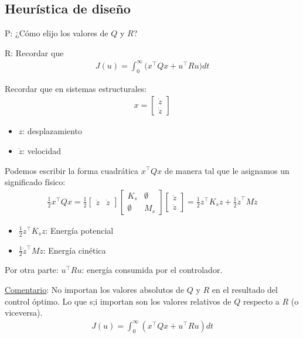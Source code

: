 \subsection{Heurística de diseño}
\par P: ¿Cómo elijo los valores de $Q$ y $R$? 
\par R: Recordar que
\begin{align*}
    J(u) = \int_0^\infty \Big( x^\top Qx+u^\top Ru\Big) dt
\end{align*}
\par Recordar que en sistemas estructurales:
\begin{align*}
    x = \left[
    \begin{array}{c}
     \dot{z} \\ \dot{z} 
    \end{array}\right]
\end{align*}

\begin{itemize}
    \item $z$: desplazamiento
    \item $\dot{z}$: velocidad
\end{itemize}

Podemos escribir la forma cuadrática $x^\top Q x$ de manera tal que le asignamos un significado físico:
\begin{align*}
    \frac{1}{2}x^\top Qx=\frac{1}{2}\left[
    \begin{array}{cc}
     \dot{z} & \dot{z} 
    \end{array}\right] \left[
    \begin{array}{cc}
     K_s & \emptyset \\ \emptyset & M_s 
    \end{array}\right] \left[
    \begin{array}{c}
     \dot{z} \\ \dot{z} 
    \end{array}\right] = \frac{1}{2}z^\top K_s z+\frac{1}{2}\dot{z}^\top M\dot{z}
\end{align*}
\begin{itemize}
    \item $\frac{1}{2}z^\top K_s z$: Energía potencial
    \item $\frac{1}{2}\dot{z}^\top M\dot{z}$: Energía cinética
\end{itemize}

Por otra parte: $u^\top Ru$: energía consumida por el controlador.
\par \underline{Comentario}: No importan los valores absolutos de $Q$ y $R$ en el resultado del control óptimo. Lo que s;i importan son los valores relativos de $Q$ respecto a $R$ (o viceversa).
\begin{align*}
    J(u)=\int_0^\infty (x^\top Qx+u^\top Ru)dt
\end{align*}

